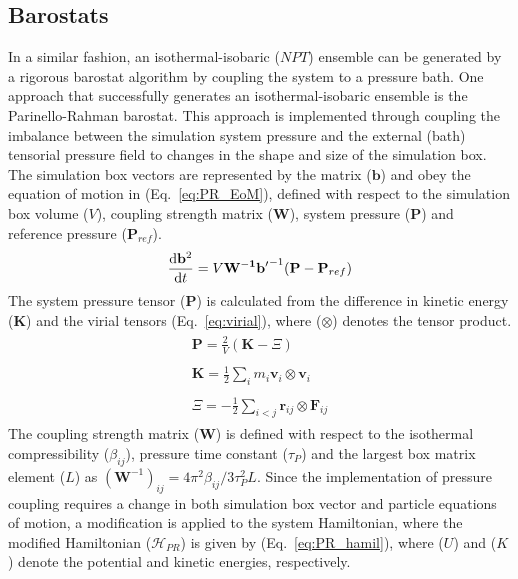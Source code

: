 \subsection{Barostats}
In a similar fashion, an isothermal-isobaric ($NPT$) ensemble can be generated by a rigorous barostat algorithm by coupling the system to a pressure bath. One approach that successfully generates an isothermal-isobaric ensemble is the Parinello-Rahman barostat.\cite{parrinello1981polymorphic} This approach is implemented through coupling the imbalance between the simulation system pressure and the external (bath) tensorial pressure field to changes in the shape and size of the simulation box. The simulation box vectors are represented by the matrix ($\mathbf{b}$) and obey the equation of motion in (Eq.~\ref{eq:PR_EoM}), defined with respect to the simulation box volume ($V$), coupling strength matrix ($\mathbf{W}$), system pressure ($\mathbf{P}$) and reference pressure ($\mathbf{P}_{ref}$).
%
\begin{equation} \label{eq:PR_EoM}
    \frac{\mathrm{d}\mathbf{b}^2}{\mathrm{d}t} = V \mathbf{W^{-1}}\mathbf{b'}^{-1} (\mathbf{P}-\mathbf{P}_{ref})
\end{equation}
%
The system pressure tensor ($\mathbf{P}$) is calculated from the difference in kinetic energy ($\mathbf{K}$) and the virial tensors (Eq.~\ref{eq:virial}), where ($\otimes$) denotes the tensor product. 
%
\begin{subequations} \label{eq:virial}
\begin{align}
\begin{split}
    \mathbf{P} = \frac{2}{V}(\mathbf{K} - \Xi)
\end{split}\\
\begin{split}
    \mathbf{K} = \frac{1}{2}\sum_i m_i \mathbf{v}_i \otimes \mathbf{v}_i
\end{split}\\
\begin{split}
    \Xi = -\frac{1}{2}\sum_{i<j} \mathbf{r}_{ij} \otimes \mathbf{F}_{ij} 
\end{split}
\end{align}
\end{subequations}
%
The coupling strength matrix ($\mathbf{W}$) is defined with respect to the isothermal compressibility ($\beta_{ij}$), pressure time constant ($\tau_P$) and the largest box matrix element ($L$) as $(\mathbf{W}^{-1})_{ij} = 4 \pi^2 \beta_{ij} / 3 \tau_P^2 L$. Since the implementation of pressure coupling requires a change in both simulation box vector and particle equations of motion, a modification is applied to the system Hamiltonian, where the modified Hamiltonian ($\mathcal{H}_{PR}$) is given by (Eq.~\ref{eq:PR_hamil}), where ($U$) and ($K$) denote the potential and kinetic energies, respectively. 

